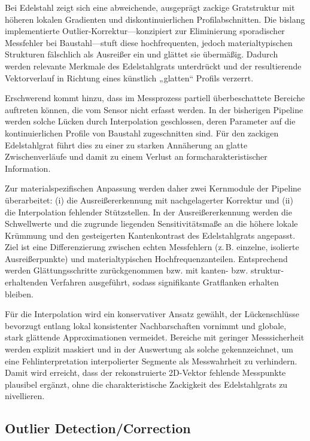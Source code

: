 Bei Edelstahl zeigt sich eine abweichende, ausgeprägt zackige Gratstruktur mit höheren lokalen Gradienten und diskontinuierlichen Profilabschnitten. Die bislang implementierte Outlier-Korrektur—konzipiert zur Eliminierung sporadischer Messfehler bei Baustahl—stuft diese hochfrequenten, jedoch materialtypischen Strukturen fälschlich als Ausreißer ein und glättet sie übermäßig. Dadurch werden relevante Merkmale des Edelstahlgrats unterdrückt und der resultierende Vektorverlauf in Richtung eines künstlich „glatten“ Profils verzerrt.

Erschwerend kommt hinzu, dass im Messprozess partiell überbeschattete Bereiche auftreten können, die vom Sensor nicht erfasst werden. In der bisherigen Pipeline werden solche Lücken durch Interpolation geschlossen, deren Parameter auf die kontinuierlichen Profile von Baustahl zugeschnitten sind. Für den zackigen Edelstahlgrat führt dies zu einer zu starken Annäherung an glatte Zwischenverläufe und damit zu einem Verlust an formcharakteristischer Information.

Zur materialspezifischen Anpassung werden daher zwei Kernmodule der Pipeline überarbeitet: (i) die Ausreißererkennung mit nachgelagerter Korrektur und (ii) die Interpolation fehlender Stützstellen. In der Ausreißererkennung werden die Schwellwerte und die zugrunde liegenden Sensitivitätsmaße an die höhere lokale Krümmung und den gesteigerten Kantenkontrast des Edelstahlgrats angepasst. Ziel ist eine Differenzierung zwischen echten Messfehlern (z.\,B. einzelne, isolierte Ausreißerpunkte) und materialtypischen Hochfrequenzanteilen. Entsprechend werden Glättungsschritte zurückgenommen bzw. mit kanten- bzw. struktur­erhaltenden Verfahren ausgeführt, sodass signifikante Gratflanken erhalten bleiben. 

Für die Interpolation wird ein konservativer Ansatz gewählt, der Lückenschlüsse bevorzugt entlang lokal konsistenter Nachbarschaften vornimmt und globale, stark glättende Approximationen vermeidet. Bereiche mit geringer Messsicherheit werden explizit maskiert und in der Auswertung als solche gekennzeichnet, um eine Fehlinterpretation interpolierter Segmente als Messwahrheit zu verhindern. Damit wird erreicht, dass der rekonstruierte 2D-Vektor fehlende Messpunkte plausibel ergänzt, ohne die charakteristische Zackigkeit des Edelstahlgrats zu nivellieren.

\subsection{Outlier Detection/Correction}

